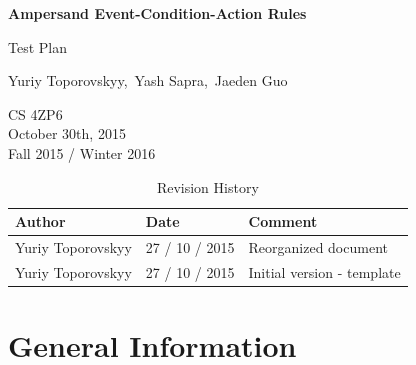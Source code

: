 \documentclass[12pt]{report}
\begin{document}
\begin{titlepage}\begin{center}
\thispagestyle{empty} %

\vspace*{1cm}

{\Huge\textbf{Ampersand Event-Condition-Action Rules}}

\vspace{0.5cm}
{\Large Test Plan

\vspace{1.5cm}
Yuriy Toporovskyy,\ Yash Sapra,\ Jaeden Guo}
\vfill 


\end{center}
CS 4ZP6 \\
October 30th, 2015 \\ 
Fall 2015 / Winter 2016 
\end{titlepage}


\begin{table}[ht!]\begin{center}
\caption{Revision History}  
\begin{tabular}{|l|l|l|}\hline
\textbf{Author} & \textbf{Date} & \textbf{Comment} \\\hline 
Yuriy Toporovskyy & 27 / 10 / 2015 & Reorganized document \\\hline
Yuriy Toporovskyy & 27 / 10 / 2015 & Initial version - template \\\hline
\end{tabular}
\end{center}\end{table}

\newpage

\tableofcontents

\newpage
{} %

%
%

\chapter{General Information}\label{ch:General}
\end{document}
